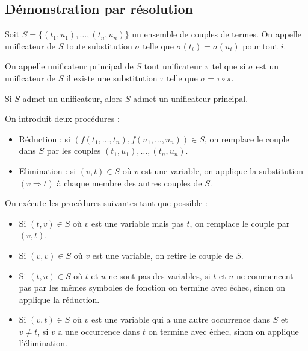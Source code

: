 \documentclass[9pt]{beamer}
\begin{document}
\subsection{Démonstration par résolution}

\begin{frame}
\begin{definition}
  Soit $S = \{(t_1,u_1),\dots,(t_n,u_n)\}$ un ensemble de couples de termes. On appelle unificateur de $S$ toute substitution $\sigma$ telle que $\sigma(t_i)=\sigma(u_i)$ pour tout $i$.

  On appelle unificateur principal de $S$ tout unificateur $\pi$ tel que si $\sigma$ est un unificateur de $S$ il existe une substitution $\tau$ telle que $\sigma=\tau\circ\pi$.
\end{definition}

\begin{theorem}
  Si $S$ admet un unificateur, alors $S$ admet un unificateur principal.
\end{theorem}
\end{frame}

\begin{frame}
On introduit deux procédures :
\begin{itemize}
\item Réduction : si $(f(t_1,\dots,t_n),f(u_1,\dots,u_n)) \in S$, on remplace le couple dans $S$ par les couples $(t_1,u_1),\dots,(t_n,u_n)$.
\item Elimination : si $(v,t) \in S$ où $v$ est une variable, on applique la substitution $(v\Rightarrow t)$ à chaque membre des autres couples de $S$.
\end{itemize}

On exécute les procédures suivantes tant que possible :
\begin{itemize}
\item Si $(t,v)\in S$ où $v$ est une variable mais pas $t$, on remplace le couple par $(v,t)$.
\item Si $(v,v)\in S$ où $v$ est une variable, on retire le couple de $S$.
\item Si $(t,u)\in S$ où $t$ et $u$ ne sont pas des variables, si $t$ et $u$ ne commencent pas par les mêmes symboles de fonction on termine avec échec, sinon on applique la réduction.
\item Si $(v,t)\in S$ où $v$ est une variable qui a une autre occurrence dans $S$ et $v\neq t$, si $v$ a une occurrence dans $t$ on termine avec échec, sinon on applique l'élimination.
\end{itemize}
\end{frame}
\end{document}
